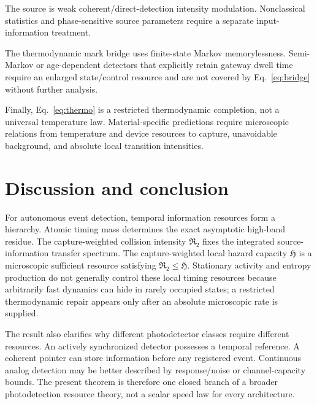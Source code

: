 \documentclass[aps,prapplied,preprint,nofootinbib]{revtex4-2}
\newcommand{\Rtwo}{\mathfrak R_2}
\newcommand{\Hcap}{\mathfrak H}
\begin{document}
The source is weak coherent/direct-detection intensity modulation. Nonclassical statistics and phase-sensitive source parameters require a separate input-information treatment.

The thermodynamic mark bridge uses finite-state Markov memorylessness. Semi-Markov or age-dependent detectors that explicitly retain gateway dwell time require an enlarged state/control resource and are not covered by Eq.~\eqref{eq:bridge} without further analysis.

Finally, Eq.~\eqref{eq:thermo} is a restricted thermodynamic completion, not a universal temperature law. Material-specific predictions require microscopic relations from temperature and device resources to capture, unavoidable background, and absolute local transition intensities.

\section{Discussion and conclusion}

For autonomous event detection, temporal information resources form a hierarchy. Atomic timing mass determines the exact asymptotic high-band residue. The capture-weighted collision intensity $\Rtwo$ fixes the integrated source-information transfer spectrum. The capture-weighted local hazard capacity $\Hcap$ is a microscopic sufficient resource satisfying $\Rtwo\le\Hcap$. Stationary activity and entropy production do not generally control these local timing resources because arbitrarily fast dynamics can hide in rarely occupied states; a restricted thermodynamic repair appears only after an absolute microscopic rate is supplied.

The result also clarifies why different photodetector classes require different resources. An actively synchronized detector possesses a temporal reference. A coherent pointer can store information before any registered event. Continuous analog detection may be better described by response/noise or channel-capacity bounds. The present theorem is therefore one closed branch of a broader photodetection resource theory, not a scalar speed law for every architecture.

\appendix



\end{document}
